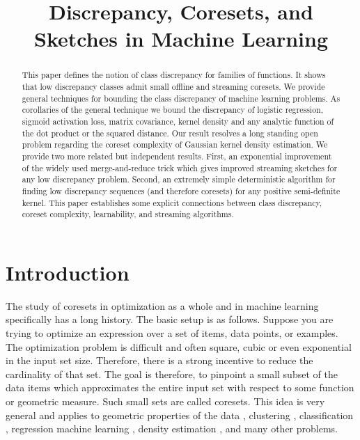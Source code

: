 \documentclass[anon,12pt]{colt2019} %
\title[Discrepancy, Coresets, and Sketches in Machine Learning]{Discrepancy, Coresets, and Sketches in Machine Learning}
\begin{document}
\maketitle

\begin{abstract}
This paper defines the notion of class discrepancy for families of functions.  It shows that low discrepancy classes admit small offline and streaming coresets. We provide general techniques for bounding the class discrepancy of machine learning problems. 
As corollaries of the general technique we bound the discrepancy of logistic regression, sigmoid activation loss, matrix covariance, kernel density and any analytic function of the dot product or the squared distance.
Our result resolves a long standing open problem regarding the coreset complexity of Gaussian kernel density estimation.  
We provide two more related but independent results. 
First, an exponential improvement of the widely used merge-and-reduce trick which gives improved streaming sketches for any low discrepancy problem.
Second, an extremely simple deterministic algorithm for finding low discrepancy sequences (and therefore coresets) for any positive semi-definite kernel. 
This paper establishes some explicit connections between class discrepancy, coreset complexity, learnability, and streaming algorithms. 
\end{abstract}


\section{Introduction}
The study of coresets in optimization as a whole and in machine learning specifically has a long history. 
The basic setup is as follows.
Suppose you are trying to optimize an expression over a set of items, data points, or examples.
The optimization problem is difficult and often square, cubic or even exponential in the input set size.
Therefore, there is a strong incentive to reduce the cardinality of that set. 
The goal is therefore, to pinpoint a small subset of the data items which approximates the entire input set with respect to some function or geometric measure. Such small sets are called coresets. 
This idea is very general and applies to geometric properties of the data \cite{agarwal2005geometric}, 
clustering \cite{DBLP:conf/compgeom/Har-PeledK05} \cite{DBLP:conf/stoc/FeldmanL11}, classification \cite{DBLP:conf/ijcai/Har-PeledRZ07}, regression \cite{DBLP:conf/nips/MunteanuSSW18} 
machine learning \cite{bachem2017practical}, density estimation \cite{DBLP:journals/corr/abs-1802-01751}, and many other problems. 
\end{document}

